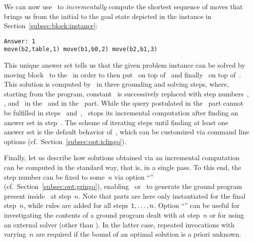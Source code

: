 We can now use \iclingo\ to \emph{incrementally} compute the shortest
sequence of moves that brings us from the initial to the goal state
depicted in the instance in Section~\ref{subsec:block:instance}:%
%
\begin{lstlisting}[numbers=none]
Answer: 1
move(b2,table,1) move(b1,b0,2) move(b2,b1,3)
\end{lstlisting}
%
This unique answer set tells us that the given problem instance can
be solved by moving block~ to the~ in order to
then put~ on top of~ and finally~ on top of~.
This solution is computed by \iclingo\ in three grounding and solving steps,
where, starting from the  program, constant~
is successively replaced with step numbers~, , and~
in the~ and in the~ part.
While the query postulated in the~ part cannot be
fulfilled in steps~ and~, \iclingo\ 
stops its incremental computation after finding an answer set in step~.
The scheme of iterating steps until finding at least one answer set
is the default behavior of~\iclingo,
which can be customized via command line options
(cf.\ Section~\ref{subsec:opt:iclingo}).

Finally, let us describe how solutions obtained via an incremental computation
can be computed in the standard way, that is, in a single pass.
To this end, the step number can be fixed to some~$n$ via
option ``'' (cf.\ Section~\ref{subsec:opt:gringo}),
enabling \gringo\ or \clingo\ to generate the ground program present
inside \iclingo\ at step~$n$.
Note that  parts are here only instantiated for the final step~$n$,
while \const{\#cumulative} rules are added for all steps $\texttt{1},\dots,n$.
Option ``\code{--ifixed=$n$}'' can be useful for investigating the contents
of a ground program dealt with at step~$n$ or for using an external solver
(other than \clasp).
In the latter case, repeated invocations with varying~$n$
are required if the bound of an optimal solution is a priori unknown.


